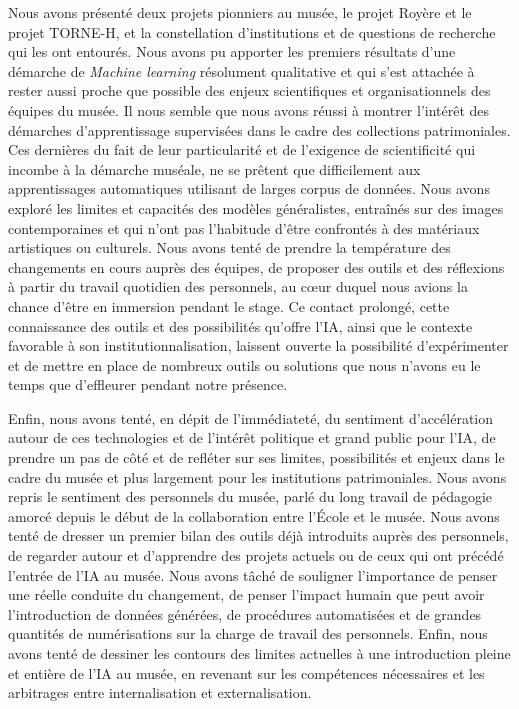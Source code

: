 Nous avons présenté deux projets pionniers au musée, le projet Royère et le projet TORNE-H, et la constellation d'institutions et de questions de recherche qui les ont entourés. Nous avons pu apporter les premiers résultats d'une démarche de \textit{Machine learning} résolument qualitative et qui s'est attachée à rester aussi proche que possible des enjeux scientifiques et organisationnels des équipes du musée. Il nous semble que nous avons réussi à montrer l'intérêt des démarches d'apprentissage supervisées dans le cadre des collections patrimoniales. Ces dernières du fait de leur particularité et de l'exigence de scientificité qui incombe à la démarche muséale, ne se prêtent que difficilement aux apprentissages automatiques utilisant de larges corpus de données. Nous avons exploré les limites et capacités des modèles généralistes, entraînés sur des images contemporaines et qui n'ont pas l'habitude d'être confrontés à des matériaux artistiques ou culturels. Nous avons tenté de prendre la température des changements en cours auprès des équipes, de proposer des outils et des réflexions à partir du travail quotidien des personnels, au cœur duquel nous avions la chance d'être en immersion pendant le stage. Ce contact prolongé, cette connaissance des outils et des possibilités qu'offre l'IA, ainsi que le contexte favorable à son institutionnalisation, laissent ouverte la possibilité d'expérimenter et de mettre en place de nombreux outils ou solutions que nous n'avons eu le temps que d’effleurer pendant notre présence.

Enfin, nous avons tenté, en dépit de l'immédiateté, du sentiment d'accélération autour de ces technologies et de l'intérêt politique et grand public pour l'IA, de prendre un pas de côté et de refléter sur ses limites, possibilités et enjeux dans le cadre du musée et plus largement pour les institutions patrimoniales. Nous avons repris le sentiment des personnels du musée, parlé du long travail de pédagogie amorcé depuis le début de la collaboration entre l'École et le musée. Nous avons tenté de dresser un premier bilan des outils déjà introduits auprès des personnels, de regarder autour et d'apprendre des projets actuels ou de ceux qui ont précédé l'entrée de l'IA au musée. Nous avons tâché de souligner l'importance de penser une réelle conduite du changement, de penser l'impact humain que peut avoir l'introduction de données générées, de procédures automatisées et de grandes quantités de numérisations sur la charge de travail des personnels. Enfin, nous avons tenté de dessiner les contours des limites actuelles à une introduction pleine et entière de l'IA au musée, en revenant sur les compétences nécessaires et les arbitrages entre internalisation et externalisation.\\[0,5cm]


